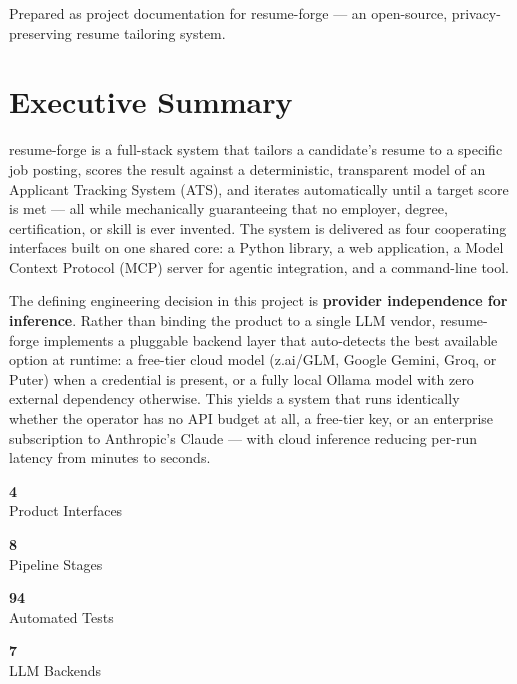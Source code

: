 \documentclass[10.5pt,letterpaper]{article}
\newcommand{\metric}[2]{%
  \begin{minipage}[t]{0.235\textwidth}
    \centering
    {\fontsize{22}{24}\selectfont\bfseries\color{brandIndigo}#1}\\[2pt]
    {\small\color{brandSlateLight}\textsf{#2}}
  \end{minipage}%
}
\begin{document}
\begin{titlepage}
\vfill
\begin{center}
  {\sffamily\footnotesize\color{white!65!black}
   Prepared as project documentation for resume-forge --- an open-source,
   privacy-preserving resume tailoring system.}
\end{center}
\vspace{1cm}
\restoregeometry
\end{titlepage}
\setcounter{page}{1}

\pagestyle{plain}
\tableofcontents
\thispagestyle{plain}
\newpage
\pagestyle{fancy}

\section*{\textcolor{brandIndigoDark}{Executive Summary}}

resume-forge is a full-stack system that tailors a candidate's resume to a specific job
posting, scores the result against a deterministic, transparent model of an Applicant
Tracking System (ATS), and iterates automatically until a target score is met --- all while
mechanically guaranteeing that no employer, degree, certification, or skill is ever invented.
The system is delivered as four cooperating interfaces built on one shared core: a Python
library, a web application, a Model Context Protocol (MCP) server for agentic integration,
and a command-line tool.

The defining engineering decision in this project is \textbf{provider independence for
inference}. Rather than binding the product to a single LLM vendor, resume-forge implements
a pluggable backend layer that auto-detects the best available option at runtime: a free-tier
cloud model (z.ai/GLM, Google Gemini, Groq, or Puter) when a credential is present, or a fully
local Ollama model with zero external dependency otherwise. This yields a system that runs
identically whether the operator has no API budget at all, a free-tier key, or an enterprise
subscription to Anthropic's Claude --- with cloud inference reducing per-run latency from
minutes to seconds.

\begin{center}
\begin{tcolorbox}[colback=brandBgGray, colframe=brandBorder, boxrule=0.6pt, arc=3pt,
  left=6pt,right=6pt,top=10pt,bottom=10pt, width=\textwidth]
\centering
\metric{4}{Product Interfaces}
\metric{8}{Pipeline Stages}
\metric{94}{Automated Tests}
\metric{7}{LLM Backends}
\end{tcolorbox}
\end{center}
\end{document}
